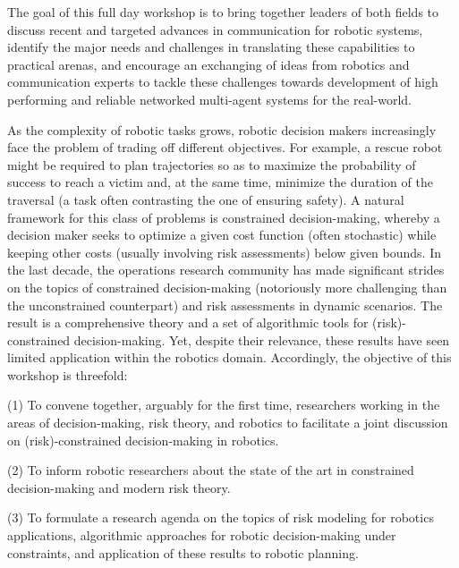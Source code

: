 \begin{spacing}{1.0}
{The goal of this full day workshop is to bring together leaders of both fields to discuss recent and targeted advances in communication for robotic systems, identify the major needs and challenges in translating these capabilities to practical arenas, and encourage an exchanging of ideas from robotics and communication experts to tackle these challenges towards development of high performing and reliable networked multi-agent systems for the real-world.

}



{
As the complexity of robotic tasks grows, robotic decision makers increasingly face the problem of trading off different objectives. For example, a rescue robot might be required to plan trajectories so as to maximize the probability of success to reach a victim and, at the same time, minimize the duration of the traversal (a task often contrasting the one of ensuring safety). A natural framework for this class of problems is constrained decision-making, whereby a decision maker seeks to optimize a given cost function (often stochastic) while keeping other costs (usually involving risk assessments) below given bounds. In the last decade, the operations research community has made significant strides on the topics of constrained decision-making (notoriously more challenging than the unconstrained counterpart) and risk assessments in dynamic scenarios. The result is a comprehensive theory and a set of algorithmic tools for (risk)-constrained decision-making. Yet, despite their relevance, these results have seen limited application within the robotics domain. Accordingly, the objective of this workshop is threefold: 

(1) To convene together, arguably for the first time, researchers working in the areas of decision-making, risk theory, and robotics to facilitate a joint discussion on (risk)-constrained decision-making in robotics.  

(2) To inform robotic researchers about the state of the art in constrained decision-making and modern risk theory.

(3) To formulate a research agenda on the topics of risk modeling for robotics applications, algorithmic approaches for robotic decision-making under constraints, and application of these results to robotic planning.
}




\end{spacing}
